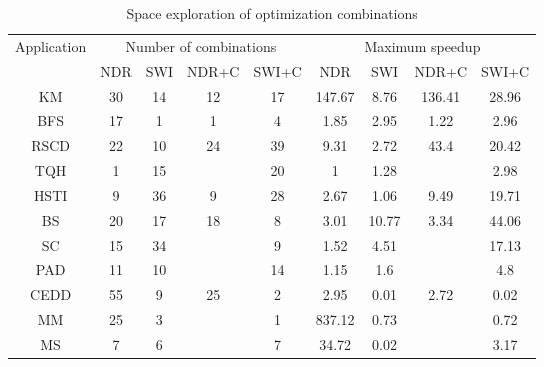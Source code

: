 \begin{table}%
	\centering
	\begin{scriptsize}
		\begin{tabular}{|c|c|c|c|c|c|c|c|c|}
			\hline
		    \multirow{2}{*}{Application} & \multicolumn{4}{c|}{Number of combinations} & \multicolumn{4}{c|}{Maximum speedup} \\
         \cline{2-9}
			
			& NDR & SWI & NDR+C & SWI+C & NDR & SWI & NDR+C & SWI+C \\
			
			\hline
			KM & 30 & 14 & 12 & 17 & 147.67 & 8.76 & 136.41 & 28.96 \\
			\hline
			BFS & 17 & 1 & 1 & 4 
			& 1.85 & 2.95 & 1.22 & 2.96 \\ 
			\hline
			RSCD & 22 & 10 & 24 & 39 & 9.31 & 2.72 & 43.4 & 20.42 \\
			\hline
			TQH & 1 & 15 & & 20 & 1 & 1.28 & & 2.98 \\
			\hline
			HSTI & 9 & 36 & 9 & 28 & 2.67 & 1.06 & 9.49 & 19.71 \\
			\hline
			BS & 20 & 17 & 18 & 8 & 3.01 & 10.77 & 3.34 & 44.06 \\
			\hline
			SC & 15 & 34 & & 9 & 1.52 & 4.51 &  & 17.13 \\
			\hline
			PAD & 11 & 10 && 14 & 1.15 & 1.6 &  & 4.8 \\
			\hline
			CEDD & 55 & 9 & 25 & 2 & 2.95 & 0.01 & 2.72 & 0.02 \\
			\hline
			MM & 25 & 3 && 1 & 837.12 & 0.73 & & 0.72 \\
			\hline
			MS & 7 & 6 && 7 & 34.72 & 0.02 & & 3.17  \\
			
			\hline
		\end{tabular}
	\end{scriptsize}
	\caption{Space exploration of optimization combinations }
	\label{t_optimization_combination}
	\vspace{-5ex}
\end{table}





 


\vspace{-1ex}
